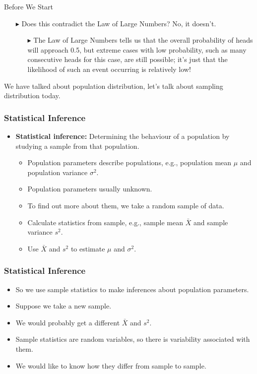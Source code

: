 \documentclass[12pt]{beamer}
\begin{document}
\begin{frame}{Before We Start}
\begin{itemize}
	\item[\color{blue}$\blacktriangleright$] Does this contradict the Law of Large Numbers? No, it doesn’t.
	\begin{itemize}
	\item[\color{blue}$\blacktriangleright$] The Law of Large Numbers tells us that the overall probability of heads will approach 0.5, but extreme cases with low probability, such as many consecutive heads for this case, are still possible; it’s just that the likelihood of such an event occurring is relatively low!
\end{itemize}
\end{itemize}
\end{frame}
	\begin{frame}
We have talked about population distribution, let's talk about sampling distribution today.
\end{frame}

\begin{frame}
	\frametitle{Statistical Inference}
	
	\begin{itemize}[label={\color{blue}$\blacktriangleright$}]
		\item \textbf{Statistical inference:} Determining the behaviour of a population by studying a sample from that population.
		\begin{itemize}[label={\color{blue}$\blacktriangleright$}]
			\item Population parameters describe populations, e.g., population mean $\mu$ and population variance $\sigma^2$.
			\item Population parameters usually unknown.
			\item To find out more about them, we take a random sample of data.
			\item Calculate statistics from sample, e.g., sample mean $\bar{X}$ and sample variance $s^2$.
			\item Use $\bar{X}$ and $s^2$ to estimate $\mu$ and $\sigma^2$.
		\end{itemize}
	\end{itemize}
	
\end{frame}

\begin{frame}
	\frametitle{Statistical Inference}
	
	\begin{itemize}[label={\color{blue}$\blacktriangleright$}]
		\item So we use sample statistics to make inferences about population parameters.
		\item Suppose we take a new sample.
		\item We would probably get a different $\bar{X}$ and $s^2$.
		\item Sample statistics are random variables, so there is variability associated with them.
		\item We would like to know how they differ from sample to sample.
	\end{itemize}
	
\end{frame}
\end{document}
